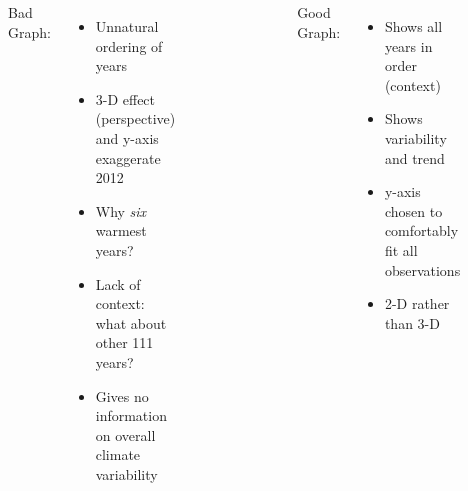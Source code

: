 \documentclass[handout]{beamer}
\begin{document}
\begin{frame}
\begin{columns}
		\begin{figure}
\end{figure}
	\footnotesize
	Bad Graph:
	\begin{itemize}
		\item Unnatural ordering of years
		\item 3-D effect (perspective) and y-axis exaggerate 2012
		\item Why \emph{six} warmest years?
		\item Lack of context: what about other 111 years?
		\item Gives no information on overall climate variability
	\end{itemize}
	
			\begin{figure}
		\small
\end{figure}
\footnotesize
Good Graph:
	\begin{itemize}
		\item Shows all years in order (context)
		\item Shows variability and trend
		\item y-axis chosen to comfortably fit all observations
		\item 2-D rather than 3-D
	\end{itemize}
	

\end{columns}
\end{frame}
\end{document}
